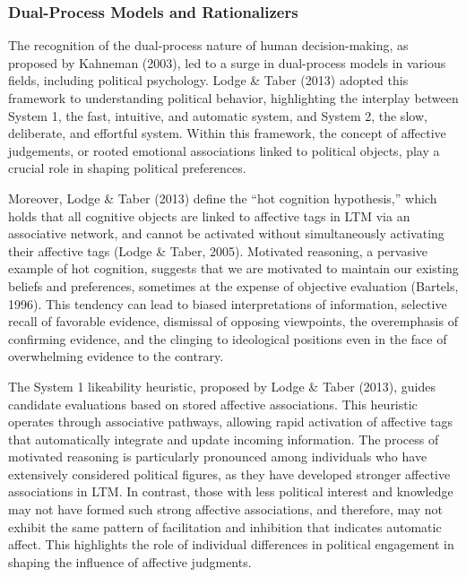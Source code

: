 \documentclass[
]{article}
\begin{document}
\hypertarget{dual-process-models-and-rationalizers}{%
\subsubsection{Dual-Process Models and
Rationalizers}\label{dual-process-models-and-rationalizers}}

The recognition of the dual-process nature of human decision-making, as
proposed by Kahneman (2003), led to a surge in dual-process models in
various fields, including political psychology. Lodge \& Taber (2013)
adopted this framework to understanding political behavior, highlighting
the interplay between System 1, the fast, intuitive, and automatic
system, and System 2, the slow, deliberate, and effortful system. Within
this framework, the concept of affective judgements, or rooted emotional
associations linked to political objects, play a crucial role in shaping
political preferences.

Moreover, Lodge \& Taber (2013) define the ``hot cognition hypothesis,''
which holds that all cognitive objects are linked to affective tags in
LTM via an associative network, and cannot be activated without
simultaneously activating their affective tags (Lodge \& Taber, 2005).
Motivated reasoning, a pervasive example of hot cognition, suggests that
we are motivated to maintain our existing beliefs and preferences,
sometimes at the expense of objective evaluation (Bartels, 1996). This
tendency can lead to biased interpretations of information, selective
recall of favorable evidence, dismissal of opposing viewpoints, the
overemphasis of confirming evidence, and the clinging to ideological
positions even in the face of overwhelming evidence to the contrary.

The System 1 likeability heuristic, proposed by Lodge \& Taber (2013),
guides candidate evaluations based on stored affective associations.
This heuristic operates through associative pathways, allowing rapid
activation of affective tags that automatically integrate and update
incoming information. The process of motivated reasoning is particularly
pronounced among individuals who have extensively considered political
figures, as they have developed stronger affective associations in LTM.
In contrast, those with less political interest and knowledge may not
have formed such strong affective associations, and therefore, may not
exhibit the same pattern of facilitation and inhibition that indicates
automatic affect. This highlights the role of individual differences in
political engagement in shaping the influence of affective judgments.
\end{document}
